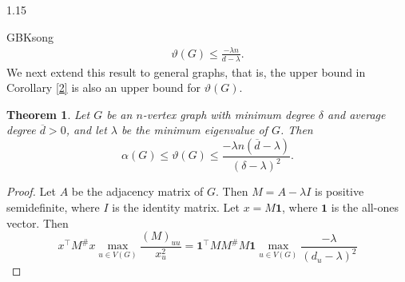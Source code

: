 \documentclass[preprint,12pt]{elsarticle}
\newtheorem{thm}{Theorem}[section]
\begin{document}
\begin{spacing}{1.15}
\begin{CJK*}{GBK}{song}
\begin{eqnarray*}
\vartheta(G)\leq\frac{-\lambda n}{d-\lambda}.
\end{eqnarray*}
We next extend this result to general graphs, that is, the upper bound in Corollary \ref{2} is also an upper bound for $\vartheta(G)$.
\begin{thm}\label{theta1}
Let $G$ be an $n$-vertex graph with minimum degree $\delta$ and average degree $\overline{d}>0$, and let $\lambda$ be the minimum eigenvalue of $G$. Then
$$\alpha(G) \leq \vartheta(G) \leq \frac{-\lambda n(\overline{d} - \lambda)}{(\delta - \lambda)^{2}}.$$
\end{thm}
\begin{proof}
Let $A$ be the adjacency matrix of $G$. Then $M=A-\lambda I$ is positive semidefinite, where $I$ is the identity matrix. Let $x= M\mathrm{\mathbf{1}}$, where $\mathbf{1}$ is the all-ones vector. Then
$$x^\top M^\#x\max_{u\in V(G)}\frac{(M)_{uu}}{x_u^2}=\mathbf{1}^\top MM^\#M{\mathbf{1}}\mathop {\max }\limits_{u \in V\left( G \right)} {\frac{{ - \lambda }}{{{{\left( {{d_u} - \lambda } \right)}^2}}}}$$


\end{proof}
\end{CJK*}
\end{spacing}
\end{document}
